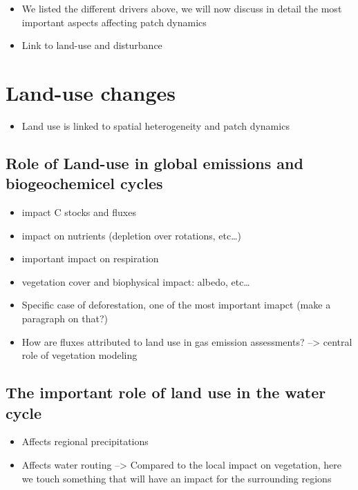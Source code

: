 \documentclass[12pt,oneside]{book}
\providecommand{\tightlist}{%
  \setlength{\itemsep}{0pt}\setlength{\parskip}{0pt}}
\begin{document}
\begin{itemize}
\tightlist
\item
  We listed the different drivers above, we will now discuss in detail
  the most important aspects affecting patch dynamics
\item
  Link to land-use and disturbance
\end{itemize}

\section{Land-use changes}\label{land-use-changes}

\begin{itemize}
\tightlist
\item
  Land use is linked to spatial heterogeneity and patch dynamics
\end{itemize}

\subsection{Role of Land-use in global emissions and biogeochemicel
cycles}\label{role-of-land-use-in-global-emissions-and-biogeochemicel-cycles}

\begin{itemize}
\tightlist
\item
  impact C stocks and fluxes
\item
  impact on nutrients (depletion over rotations, etc\ldots{})
\item
  important impact on respiration
\item
  vegetation cover and biophysical impact: albedo, etc\ldots{}
\item
  Specific case of deforestation, one of the most important imapct (make
  a paragraph on that?)
\item
  How are fluxes attributed to land use in gas emission assessments?
  --\textgreater{} central role of vegetation modeling
\end{itemize}

\subsection{The important role of land use in the water
cycle}\label{the-important-role-of-land-use-in-the-water-cycle}

\begin{itemize}
\tightlist
\item
  Affects regional precipitations
\item
  Affects water routing --\textgreater{} Compared to the local impact on
  vegetation, here we touch something that will have an impact for the
  surrounding regions
\end{itemize}
\end{document}

